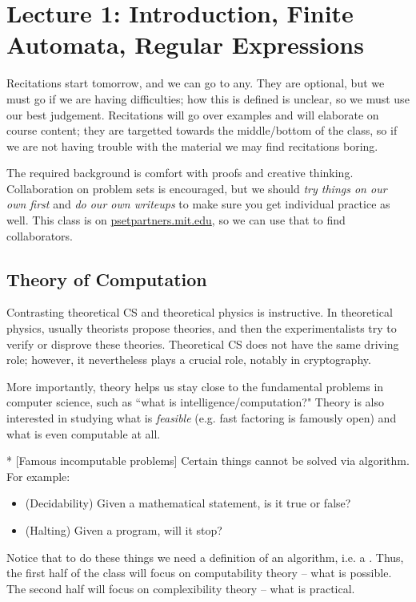 \section*{Lecture 1: Introduction, Finite Automata, Regular Expressions}
\setcounter{section}{1}

Recitations start tomorrow, and we can go to any. They are optional, but we must go if we are having difficulties; how this is defined is unclear, so we must use our best judgement. Recitations will go over examples and will elaborate on course content; they are targetted towards the middle/bottom of the class, so if we are not having trouble with the material we may find recitations boring.

The required background is comfort with proofs and creative thinking. Collaboration on problem sets is encouraged, but we should \emph{try things on our own first} and \emph{do our own writeups} to make sure you get individual practice as well. This class is on \url{psetpartners.mit.edu}, so we can use that to find collaborators. 

\subsection{Theory of Computation}

Contrasting theoretical CS and theoretical physics is instructive. 
In theoretical physics, usually theorists propose theories, and then the experimentalists try to verify or disprove these theories.
Theoretical CS does not have the same driving role; however, it nevertheless plays a crucial role, notably in cryptography. 

More importantly, theory helps us stay close to the fundamental problems in computer science, such as ``what is intelligence/computation?" 
Theory is also interested in studying what is \emph{feasible} (e.g. fast factoring is famously open) and what is even computable at all. 

\begin{exm}*
	[Famous incomputable problems]
	Certain things cannot be solved via algorithm. For example:
	\begin{itemize}
		\item (Decidability) Given a mathematical statement, is it true or false?
		\item (Halting) Given a program, will it stop?
	\end{itemize}
\end{exm}

Notice that to do these things we need a definition of an algorithm, i.e. a . 
Thus, the first half of the class will focus on computability theory -- what is possible. The second half will focus on complexibility theory -- what is practical.

